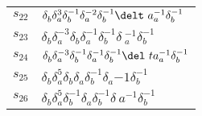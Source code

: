 \documentclass{article}
\begin{document}
\begin{center}
\begin{tabular}{ll}
$s_{22}$ & $\delta_b^{}\delta_a^{3}\delta_b^{-1}\delta_a^{-2}\delta_b^{-1}\delt\
a_a^{-1}\delta_b^{-1}$ \\
$s_{23}$ & $\delta_b^{}\delta_a^{-3}\delta_b^{}\delta_a^{-1}\delta_b^{-1}\delta\
_a^{-1}\delta_b^{-1}$ \\
$s_{24}$ & $\delta_b^{}\delta_a^{-3}\delta_b^{-1}\delta_a^{-1}\delta_b^{-1}\del\
ta_a^{-1}\delta_b^{-1}$ \\
$s_{25}$ & $\delta_b^{}\delta_a^{5}\delta_b^{}\delta_a^{}\delta_b^{-1}\delta_a^\
{-1}\delta_b^{-1}$ \\
$s_{26}$ & $\delta_b^{}\delta_a^{5}\delta_b^{-1}\delta_a^{}\delta_b^{-1}\delta_\
a^{-1}\delta_b^{-1}$ \\
\bottomrule
\end{tabular}
\end{center}

\thispagestyle{empty}
\end{document}
